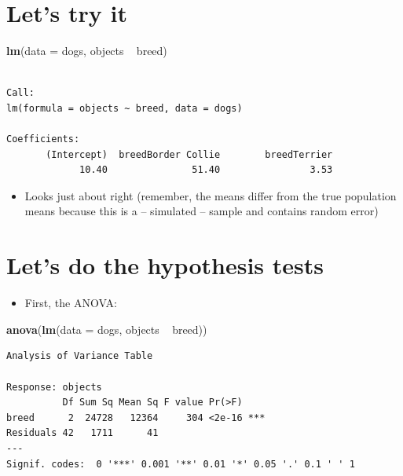 \documentclass[]{article}
\newenvironment{Shaded}{}{}
\newcommand{\KeywordTok}[1]{\textcolor[rgb]{0.00,0.44,0.13}{\textbf{{#1}}}}
\newcommand{\DataTypeTok}[1]{\textcolor[rgb]{0.56,0.13,0.00}{{#1}}}
\newcommand{\StringTok}[1]{\textcolor[rgb]{0.25,0.44,0.63}{{#1}}}
\newcommand{\NormalTok}[1]{{#1}}
\begin{document}
\section{Let's try it}\label{lets-try-it}

\begin{Shaded}
\begin{Highlighting}[]
\KeywordTok{lm}\NormalTok{(}\DataTypeTok{data =} \NormalTok{dogs, objects ~}\StringTok{ }\NormalTok{breed)}
\end{Highlighting}
\end{Shaded}

\begin{verbatim}

Call:
lm(formula = objects ~ breed, data = dogs)

Coefficients:
       (Intercept)  breedBorder Collie        breedTerrier  
             10.40               51.40                3.53  
\end{verbatim}

\begin{itemize}
\itemsep1pt\parskip0pt
\item
  Looks just about right (remember, the means differ from the true
  population means because this is a -- simulated -- sample and contains
  random error)
\end{itemize}

\section{Let's do the hypothesis
tests}\label{lets-do-the-hypothesis-tests}

\begin{itemize}
\itemsep1pt\parskip0pt
\item
  First, the ANOVA:
\end{itemize}

\begin{Shaded}
\begin{Highlighting}[]
\KeywordTok{anova}\NormalTok{(}\KeywordTok{lm}\NormalTok{(}\DataTypeTok{data =} \NormalTok{dogs, objects ~}\StringTok{ }\NormalTok{breed))}
\end{Highlighting}
\end{Shaded}

\begin{verbatim}
Analysis of Variance Table

Response: objects
          Df Sum Sq Mean Sq F value Pr(>F)    
breed      2  24728   12364     304 <2e-16 ***
Residuals 42   1711      41                   
---
Signif. codes:  0 '***' 0.001 '**' 0.01 '*' 0.05 '.' 0.1 ' ' 1
\end{verbatim}
\end{document}
